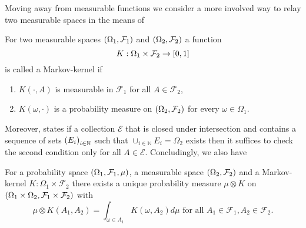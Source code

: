 Moving away from measurable functions we consider a more involved way to relay
two measurable spaces in the means of \cite[Definition 8.25]{Klenke}
\begin{definition}
  For two measurable spaces $\left(\Omega_{1},\mathcal{F}_{1}\right)$ and 
  $\left(\Omega_{2},\mathcal{F}_{2}\right)$ a function
  \begin{equation*}
    K:\Omega_{1}\times\mathcal{F}_{2}\rightarrow\left[0,1\right]
  \end{equation*}
  is called a Markov-kernel if
  \begin{enumerate}
    \item $K(\cdot, A)$ is measurable in $\mathcal{F}_{1}$ for all 
      $A\in\mathcal{F}_{2}$,
    \item $K(\omega, \cdot)$ is a probability measure on 
      $\left(\Omega_{2},\mathcal{F}_{2}\right)$ for every $\omega\in\Omega_{1}$.
  \end{enumerate}
\end{definition}
Moreover, \cite[Remark 8.26]{Klenke} states if a collection $\mathcal{E}$ that 
is closed under intersection and contains a sequence of sets 
$\left(E_{i}\right)_{i\in\mathbb{N}}$ such that 
$\cup_{i\in\mathbb{N}}E_{i} = \Omega_{2}$ exists then it suffices to check 
the second condition only for all $A\in\mathcal{E}$. Concludingly, we also have
\begin{theorem}
  \cite[Korollar 14.23]{Klenke}
  For a probability space $\left(\Omega_{1}, \mathcal{F}_{1}, \mu\right)$, a
  measurable space $\left(\Omega_{2}, \mathcal{F}_{2}\right)$ and a Markov-kernel
  $K:\Omega_{1}\times\mathcal{F}_{2}$ there exists a unique probability 
  measure $\mu\otimes K$ on $\left(\Omega_{1}\times \Omega_{2}, 
  \mathcal{F}_{1}\times\mathcal{F}_{2}\right)$ with
  \begin{equation*}
    \mu\otimes K(A_{1}, A_{2}) = \int_{\omega\in A_{1}} K(\omega, A_{2})d\mu
    \text{ for all }A_{1}\in\mathcal{F}_{1}, A_{2}\in\mathcal{F}_{2}.
  \end{equation*}
\end{theorem}
